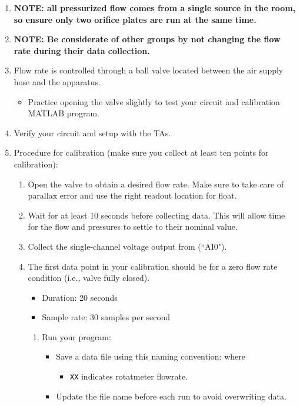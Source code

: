 \documentclass{article} %
\begin{document}
\begin{enumerate}
    \item \textbf{NOTE: all pressurized flow comes from a single source in the room, so ensure only two orifice plates are run at the same time.}
    \item \textbf{NOTE: Be considerate of other groups by not changing the flow rate during their data collection.}
    \item Flow rate is controlled through a ball valve located between the air supply hose and the apparatus. 
    \begin{itemize}
        \item Practice opening the valve slightly to test your circuit and calibration MATLAB program. 
    \end{itemize}
    \item Verify your circuit and setup with the TAs.
    \item Procedure for calibration (make sure you collect at least ten points for calibration):
    \begin{enumerate}
        \item Open the valve to obtain a desired flow rate. Make sure to take care of parallax error and use the right readout location for float.
        \item Wait for at least 10 seconds before collecting data. This will allow time for the flow and pressures to settle to their nominal value.
        \item Collect the single-channel voltage output from (``AI0").
        \item The first data point in your calibration should be for a zero flow rate condition (i.e., valve fully closed).
        \begin{itemize}
            \item Duration: 20 seconds
            \item Sample rate: 30 samples per second
        \end{itemize}
        \begin{enumerate}[label=\alph*.]
        \item Run your program:
        \begin{itemize}
            \item Save a data file using this naming convention:  where
            \begin{itemize}
                \item \texttt{XX} indicates rotatmeter flowrate.
            \end{itemize}
            \item Update the file name before each run to avoid overwriting data.
            \end{itemize}
        

\end{enumerate}
\end{enumerate}
\end{enumerate}
\end{document}
